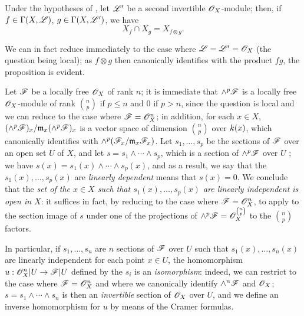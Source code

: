 \begin{env}[5.5.3]
\label{0.5.5.3}
Under the hypotheses of , let $\mathscr{L}'$ be a second invertible
$\mathscr{O}_X$-module; then, if $f\in\Gamma(X,\mathscr{L})$, $g\in\Gamma(X,\mathscr{L}')$, we have
\[
  X_f\cap X_g=X_{f\otimes g}.
\]

We can in fact reduce immediately to the case where $\mathscr{L}=\mathscr{L}'=\mathscr{O}_X$ (the question
being local); as $f\otimes g$ then canonically identifies with the product $fg$, the
proposition is evident.
\end{env}

\begin{env}[5.5.4]
\label{0.5.5.4}
Let $\mathscr{F}$ be a locally free $\mathscr{O}_X$ of rank $n$; it is immediate that $\wedge^p\mathscr{F}$ is
a locally free $\mathscr{O}_X$-module of rank $\binom{n}{p}$ if $p\leqslant n$ and $0$ if
$p>n$, since the question is local and we can reduce to the case where $\mathscr{F}=\mathscr{O}_X^n$;
in addition, for each $x\in X$, $(\wedge^p\mathscr{F})_x/\mathfrak{m}_x(\wedge^p\mathscr{F})_x$ is a
vector space of dimension $\binom{n}{p}$ over $k(x)$, which canonically identifies with
$\wedge^p(\mathscr{F}_x/\mathfrak{m}_x\mathscr{F}_x)$. Let $s_1,\dots,s_p$ be the sections of $\mathscr{F}$
over an open set $U$ of $X$, and let $s=s_1\wedge\cdots\wedge s_p$, which is a section of
$\wedge^p\mathscr{F}$ over $U$ ; we have $s(x)=s_1(x)\wedge\cdots\wedge s_p(x)$,
and as a result, we say that the $s_1(x),\dots,s_p(x)$ are {\em linearly dependent} means
that $s(x)=0$. We conclude that the {\em set of the $x\in X$ such that $s_1(x),\dots,s_p(x)$
are linearly independent is open in $X$}: it suffices in fact, by reducing to the case where
$\mathscr{F}=\mathscr{O}_X^n$, to apply  to the section image of $s$ under one of the
projections of $\wedge^p\mathscr{F}=\mathscr{O}_X^{\binom{n}{p}}$ to the $\binom{n}{p}$ factors.

In particular, if $s_1,\dots,s_n$ are $n$ sections of $\mathscr{F}$ over $U$ such that
$s_1(x),\dots,s_n(x)$ are linearly independent for each point $x\in U$, the homomorphism
$u:\mathscr{O}_X^n|U\to\mathscr{F}|U$ defined by the $s_i$  is an {\em isomorphism}:
indeed, we can restrict to the case where $\mathscr{F}=\mathscr{O}_X^n$ and where we canonically identify
$\wedge^n\mathscr{F}$ and $\mathscr{O}_X$; $s=s_1\wedge\cdots\wedge s_n$ is then an {\em invertible}
section of $\mathscr{O}_X$ over $U$, and we define an inverse homomorphism for $u$ by means of the
Cramer formulas.
\end{env}


